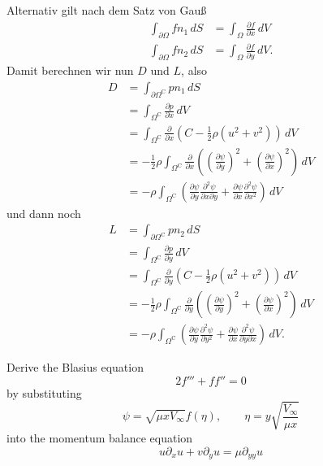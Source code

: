 \documentclass[12pt]{exam}
\newcommand{\del}{\partial}
\begin{document}
\begin{questions}
\begin{solution}
        Alternativ gilt nach dem Satz von Gauß
        \begin{align*}
            \int_{\del \Omega} f n_1 \, dS &= \int_{ \Omega}\frac{\del f}{\del x} \, dV  \\
            \int_{\del \Omega} f n_2 \, dS &= \int_{ \Omega}\frac{\del f}{\del y} \, dV.
        \end{align*}
        Damit berechnen wir nun $D$ und $L$, also
        \begin{align*}
            D &= \int_{\del \Omega^{\mathrm{C}}} p n_1 \, dS \\
            &= \int_{\Omega^{\mathrm{C}}} \frac{\del p}{\del x} \, dV \\
            &= \int_{ \Omega^{\mathrm{C}}} \frac{\del}{\del x} \left( C - \frac{1}{2} \rho \left( u^2 + v^2 \right) \right) \, dV \\
            &= -\frac{1}{2} \rho \int_{\Omega^{\mathrm{C}}} \frac{\del}{\del x} \left( \left( \frac{\del \psi}{\del y} \right)^2 + \left( \frac{\del \psi}{\del x} \right)^2 \right) \, dV \\
            &= -\rho \int_{\Omega^{\mathrm{C}}} \left( \frac{\del \psi}{\del y} \frac{\del^2 \psi}{\del x \del y} + \frac{\del \psi}{\del x} \frac{\del^2 \psi}{\del x^2} \right) \, dV
        \end{align*}
        und dann noch
        \begin{align*}
            L &= \int_{\del \Omega^{\mathrm{C}}} p n_2 \, dS \\
            &= \int_{\Omega^{\mathrm{C}}} \frac{\del p}{\del y} \, dV \\
            &= \int_{\Omega^{\mathrm{C}}} \frac{\del}{\del y} \left( C - \frac{1}{2} \rho \left( u^2 + v^2 \right) \right) \, dV \\
            &= -\frac{1}{2} \rho \int_{ \Omega^{\mathrm{C}}} \frac{\del}{\del y} \left( \left( \frac{\del \psi}{\del y} \right)^{2} + \left( \frac{\del \psi}{\del x} \right)^{2} \right) \, dV \\
            &= -\rho \int_{ \Omega^{\mathrm{C}}} \left( \frac{\del \psi}{\del y} \frac{\del^2 \psi}{\del y^2} + \frac{\del \psi}{\del x} \frac{\del^2 \psi}{\del y \del x} \right) \, dV.
        \end{align*}
    \end{solution}
    
    
    \question Derive the Blasius equation
    \begin{equation*}
        2 f''' + ff'' = 0
    \end{equation*}
    by substituting
    \begin{equation*}
        \psi = \sqrt{\mu x V_{\infty}} f(\eta), \qquad \eta = y \sqrt{\frac{V_{\infty}}{\mu x}}
    \end{equation*}
    into the momentum balance equation
    \begin{equation*}
        u \del_x u + v \del_y u = \mu \del_{yy} u
    \end{equation*}
    

\end{questions}
\end{document}
